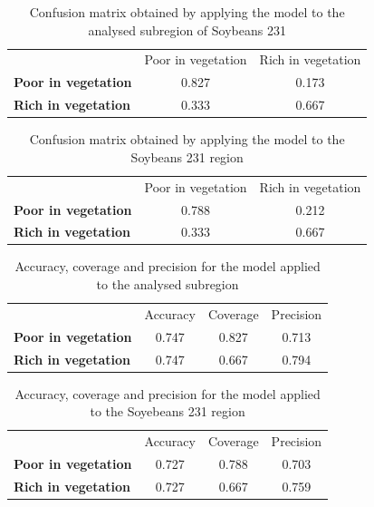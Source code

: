 \documentclass[12pt]{article}
\begin{document}
\begin{table}[hbt]
  \centering
  \caption{Confusion matrix obtained by applying the model to the analysed subregion of Soybeans 231}\label{tab:subregion_sb231_confusion_matrix}
  \begin{tabular}{lcc}
    \toprule
    & Poor in vegetation & Rich in vegetation\\
    \cmidrule{2-3}
    \textbf{Poor in vegetation} & 0.827 & 0.173\\
    \textbf{Rich in vegetation} & 0.333 & 0.667\\
    \bottomrule
  \end{tabular}
\end{table}

\begin{table}[hbt]
  \centering
  \caption{Confusion matrix obtained by applying the model to the Soybeans 231 region}\label{tab:sb231_confusion_matrix}
  \begin{tabular}{lcc}
    \toprule
    & Poor in vegetation & Rich in vegetation\\
    \cmidrule{2-3}
    \textbf{Poor in vegetation} & 0.788 & 0.212\\
    \textbf{Rich in vegetation} & 0.333 & 0.667\\
    \bottomrule
  \end{tabular}
\end{table}

\begin{table}[hbt]
  \centering
  \caption{Accuracy, coverage and precision for the model applied to the analysed subregion}\label{tab:subregion_sb231_analysis}
  \begin{tabular}{lccc}
    \toprule
    & Accuracy & Coverage & Precision\\
    \cmidrule{2-4}
    \textbf{Poor in vegetation} & 0.747 & 0.827 & 0.713\\
    \textbf{Rich in vegetation} & 0.747 & 0.667 & 0.794\\
    \bottomrule
  \end{tabular}
\end{table}

\begin{table}[hbt]
  \centering
  \caption{Accuracy, coverage and precision for the model applied to the Soyebeans 231 region}\label{tab:sb231_analysis}
  \begin{tabular}{lccc}
    \toprule
    & Accuracy & Coverage & Precision\\
    \cmidrule{2-4}
    \textbf{Poor in vegetation} & 0.727 & 0.788 & 0.703\\
    \textbf{Rich in vegetation} & 0.727 & 0.667 & 0.759\\
    \bottomrule
  \end{tabular}
\end{table}
\end{document}
